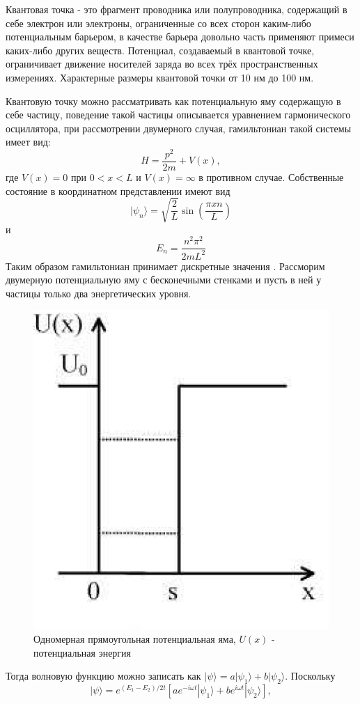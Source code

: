 \documentclass[14pt,a4paper]{PhDthesis}
\begin{document}
Квантовая точка - это фрагмент проводника или полупроводника, содержащий в себе электрон или электроны, ограниченные со всех сторон каким-либо потенциальным барьером, в качестве барьера довольно часть применяют примеси каких-либо других веществ. Потенциал, создаваемый в квантовой точке,
ограничивает движение носителей заряда во всех трёх пространственных измерениях. Характерные размеры квантовой точки от 10 нм до 100 нм.

Квантовую точку можно рассматривать как потенциальную яму содержащую в себе частицу, поведение такой частицы описывается уравнением гармонического осциллятора, при рассмотрении двумерного случая, гамильтониан такой системы имеет вид: 
\begin{equation}
H = \dfrac{p^{2}}{2m} + V(x),
\end{equation}
где $V(x) = 0$ при $0 < x < L$ и $V(x) = \infty$ в противном случае. Собственные состояние в координатном представлении имеют вид
\begin{equation}
|\psi_{n}\rangle = \sqrt{\frac{2}{L}}\sin(\frac{\pi x n}{L})
\end{equation}
и	
\begin{equation}
E_{n} = \frac{n^{2} \pi^{2}}{2 m L^{2}}
\end{equation}
Таким образом гамильтониан принимает дискретные значения \cite{Nilsen:2001ru}.
Рассморим двумерную потенциальную яму с бесконечными стенками и пусть в ней у частицы только два энергетических уровня. 
\begin{figure}[h!]
\centering\includegraphics[width=.50\textwidth]{images/potents.eps}
\caption{Одномерная прямоугольная потенциальная яма, $U(x)$ - потенциальная энергия}\label{ris:potents}
\end{figure}
Тогда волновую функцию можно записать как $|\psi\rangle = a|\psi_{1}\rangle + b|\psi_{2}\rangle$. Поскольку
\begin{equation}
|\psi\rangle = e^{(E_{1} - E_{2})/2t} [a e^{-i \omega t}|\psi_{1}\rangle + b e^{i \omega t} |\psi_{2}\rangle],
\end{equation}
\end{document}
